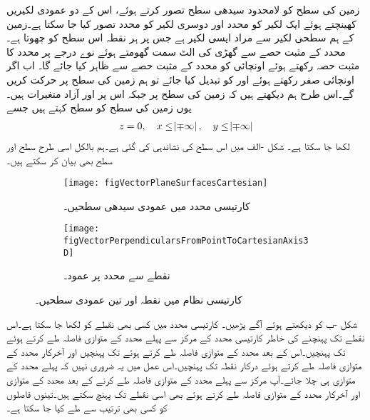 زمین کی سطح کو لامحدود سیدھی سطح تصور کرتے ہوئے،  اس کے  دو عمودی لکیریں کھینچتے ہوئے ایک لکیر کو  محدد اور دوسری لکیر کو  محدد تصور کیا جا سکتا ہے۔زمین کے ہم سطحی لکیر سے مراد ایسی لکیر ہے جس پر ہر نقطہ اس سطح کو چھوتا ہے۔ محدد کے مثبت حصے  سے گھڑی کی الٹ سمت گھومتے ہوئے نوے درجے پر  محدد کا مثبت حصہ رکھتے ہوئے اونچائی کو  محدد کے مثبت حصے  سے ظاہر کیا جائے گا۔ اب اگر اونچائی صفر رکھتے ہوئے  اور  کو تبدیل کیا جائے تو ہم زمین کی سطح پر حرکت کریں گے۔اس طرح ہم دیکھتے ہیں کہ زمین کی سطح پر  جبکہ اس پر  اور  آزاد متغیرات ہیں۔یوں زمین کی سطح کو  سطح کہتے ہیں جسے
\begin{align*}
z=0, \quad  x\le \abs{\mp \infty}, \quad y \le \abs{\mp \infty}
\end{align*} 
لکھا جا سکتا ہے۔  شکل -الف میں اس سطح کی نشاندہی کی گئی ہے۔ہم بالکل اسی طرح  سطح اور  سطح بھی بیان کر سکتے ہیں۔

\begin{figure}
\begin{subfigure}{0.5\textwidth}
\centering
\texttt{[image: figVectorPlaneSurfacesCartesian]}
\caption{کارتیسی محدد میں عمودی سیدھی سطحیں۔}
\label{شکل_سمتیہ_کارتیسی_عمودی-تین_سطحیں}
\end{subfigure}%
%
\begin{subfigure}{0.5\textwidth}
\centering
\texttt{[image: figVectorPerpendicularsFromPointToCartesianAxis3D]}
\caption{نقطے سے محدد پر عمود۔}
\label{شکل_سمتیہ_نقطے_سے_کارتیسی_محدد_پر_عمود}
\end{subfigure}%
\caption{کارتیسی نظام میں نقطہ اور تین عمودی سطحیں۔}
\label{شکل_سمتیہ_کارتیسی_نقطہ_اور_عمودی_سطحیں}
\end{figure}
شکل  -ب  کو دیکھتے ہوئے آگے  پڑھیں۔ کارتیسی محدد میں کسی بھی نقطے کو  لکھا جا سکتا ہے۔اس نقطے تک پہنچنے کی خاطر  کارتیسی محدد کے مرکز سے پہلے  محدد کے متوازی   فاصلہ طے کرتے ہوئے  تک پہنچیں۔اس کے بعد  محدد کے متوازی  فاصلہ طے کرتے ہوئے  تک پہنچیں  اور آخرکار  محدد کے متوازی  فاصلہ طے کرتے ہوئے درکار نقطہ  تک پہنچیں۔اس عمل میں یہ ضروری نہیں کہ پہلے  محدد کے متوازی ہی چلا جائے۔آپ مرکز سے پہلے  محدد کے متوازی  فاصلہ طے کرنے کے بعد  محدد کے متوازی  اور آخرکار  محدد کے متوازی  فاصلہ طے کرتے ہوئے بھی اسی نقطے تک پہنچ سکتے ہیں۔تینوں فاصلوں کو کسی بھی ترتیب سے طے کیا جا سکتا ہے۔

